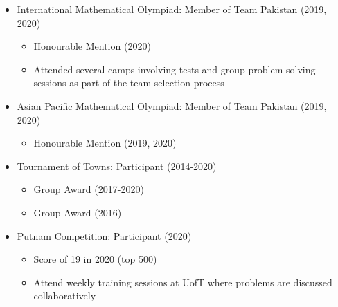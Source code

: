 \documentclass[letterpaper,11pt]{article}
\newcommand{\RN}[1]{%
  \textup{\uppercase\expandafter{\romannumeral#1}}%
}
\begin{document}
    \begin{itemize}
        \item \small{International Mathematical Olympiad: Member of Team Pakistan (2019, 2020)} \vspace{-2pt}
        \begin{itemize}
            \item \small{Honourable Mention (2020)} \vspace{-3pt}
            \item \small {Attended several camps involving tests and group problem solving sessions as part of the team selection process}
        \end{itemize}
        \item \small {Asian Pacific Mathematical Olympiad: Member of Team Pakistan (2019, 2020)} \vspace{-2pt}
        \begin{itemize}
            \item \small{Honourable Mention (2019, 2020)} \vspace{-3pt}
        \end{itemize}
        \item \small {Tournament of Towns: Participant (2014-2020)} \vspace{-2pt}
         \begin{itemize}
            \item \small{Group \RN{2} Award (2017-2020)} \vspace{-2pt}
            \item \small{Group \RN{3} Award (2016)} \vspace{-3pt}
        \end{itemize}

        \item \small {Putnam Competition: Participant (2020)}
        \begin{itemize}
          \item \small {Score of 19 in 2020 (top 500)}
          \item \small {Attend weekly training sessions at UofT where problems are discussed collaboratively}
        \end{itemize}

    \end{itemize}
\end{document}
